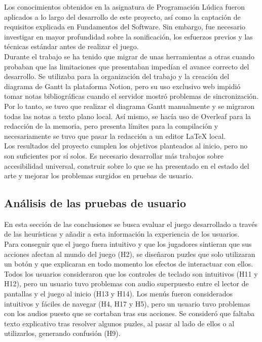 Los conocimientos obtenidos en la asignatura de Programación Lúdica fueron aplicados a lo largo del desarrollo de este proyecto, así como la captación de requisitos explicada en Fundamentos del Software. Sin embargo, fue necesario investigar en mayor profundidad sobre la sonificación, los esfuerzos previos y las técnicas estándar antes de realizar el juego.\\

Durante el trabajo se ha tenido que migrar de unas herramientas a otras cuando probaban que las limitaciones que presentaban impedían el avance correcto del desarrollo. Se utilizaba para la organización del trabajo y la creación del diagrama de Gantt la plataforma Notion, pero su uso exclusivo web impidió tomar notas bibliográficas cuando el servidor mostró problemas de sincronización. Por lo tanto, se tuvo que realizar el diagrama Gantt manualmente y se migraron todas las notas a texto plano local. Así mismo, se hacía uso de Overleaf para la redacción de la memoria, pero presenta límites para la compilación y necesariamente se tuvo que pasar la redacción a un editor LaTeX local. \\

Los resultados del proyecto cumplen los objetivos planteados al inicio, pero no son suficientes por sí solos. Es necesario desarrollar más trabajos sobre accesibilidad universal, construir sobre lo que se ha presentado en el estado del arte y mejorar los problemas surgidos en pruebas de usuario.
\subsection{Análisis de las pruebas de usuario}
En esta sección de las conclusiones se busca evaluar el juego desarrollado a través de las heurísticas y añadir a esta información la experiencia de los usuarios.\\

Para conseguir que el juego fuera intuitivo y que los jugadores sintieran que sus acciones afectan al mundo del juego (H2), se diseñaron puzles que solo utilizaran un botón y que explicaran en todo momento los efectos de interactuar con ellos. Todos los usuarios consideraron que los controles de teclado son intuitivos (H11 y H12), pero un usuario tuvo problemas con audio superpuesto entre el lector de pantallas y el juego al inicio (H13 y H14). Los menús fueron considerados intuitivos y fáciles de navegar (H4, H17 y H5), pero un usuario tuvo problemas con los audios puesto que se cortaban tras sus acciones. Se consideró que faltaba texto explicativo tras resolver algunos puzles, al pasar al lado de ellos o al utilizarlos, generando confusión (H9).\\

